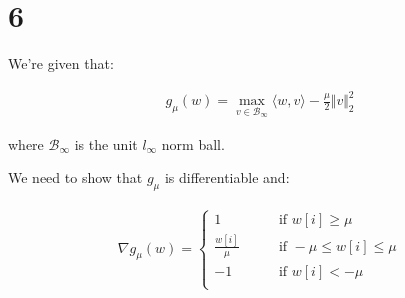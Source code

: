 \documentclass{article}
\begin{document}
\newpage






\section*{6}

We're given that:

\begin{align*}
    g_\mu(w) = \max_{v \in \mathcal{B}_\infty}\langle w, v \rangle - \frac{\mu}{2} \Vert v \Vert^2_2
\end{align*}

where $\mathcal{B}_\infty$ is the unit $l_\infty$ norm ball.
\bigskip

We need to show that $g_\mu$ is differentiable and:

\begin{align*}
    \nabla g_\mu(w) = 
    \begin{cases}
        1 \qquad &\text{if } w[i] \geq \mu \\
        \frac{w[i]}{\mu} \qquad &\text{if } - \mu \leq w[i] \leq \mu \\
        -1 \qquad &\text{if } w[i] < - \mu \\
    \end{cases}
\end{align*}
\end{document}
